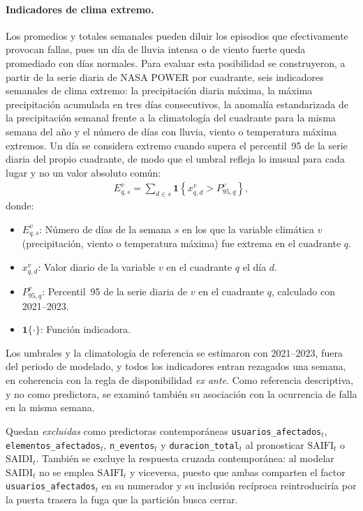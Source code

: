 \paragraph{Indicadores de clima extremo.} Los promedios y totales semanales pueden diluir los episodios que efectivamente provocan fallas, pues un día de lluvia intensa o de viento fuerte queda promediado con días normales. Para evaluar esta posibilidad se construyeron, a partir de la serie diaria de NASA POWER por cuadrante, seis indicadores semanales de clima extremo: la precipitación diaria máxima, la máxima precipitación acumulada en tres días consecutivos, la anomalía estandarizada de la precipitación semanal frente a la climatología del cuadrante para la misma semana del año y el número de días con lluvia, viento o temperatura máxima extremos. Un día se considera extremo cuando supera el percentil~95 de la serie diaria del propio cuadrante, de modo que el umbral refleja lo inusual para cada lugar y no un valor absoluto común:
\begin{equation}
    \begin{aligned}
    E_{q,s}^{v} = \sum_{d \in s} \mathbf{1}\left\{ x_{q,d}^{v} > P_{95,q}^{v} \right\},
    \end{aligned}
    \label{eq:dias_extremos}
\end{equation}
donde:
\begin{itemize}
    \item $E_{q,s}^{v}$: Número de días de la semana $s$ en los que la variable climática $v$ (precipitación, viento o temperatura máxima) fue extrema en el cuadrante $q$.
    \item $x_{q,d}^{v}$: Valor diario de la variable $v$ en el cuadrante $q$ el día $d$.
    \item $P_{95,q}^{v}$: Percentil~95 de la serie diaria de $v$ en el cuadrante $q$, calculado con 2021--2023.
    \item $\mathbf{1}\{\cdot\}$: Función indicadora.
\end{itemize}
Los umbrales y la climatología de referencia se estimaron con 2021--2023, fuera del periodo de modelado, y todos los indicadores entran rezagados una semana, en coherencia con la regla de disponibilidad \emph{ex ante}. Como referencia descriptiva, y no como predictora, se examinó también su asociación con la ocurrencia de falla en la misma semana.

Quedan \textit{excluidas} como predictoras contemporáneas \texttt{usuarios\_afectados}$_t$, \texttt{elementos\_afectados}$_t$, \texttt{n\_eventos}$_t$ y \texttt{duracion\_total}$_t$ al pronosticar $\mathrm{SAIFI}_t$ o $\mathrm{SAIDI}_t$. También se excluye la respuesta cruzada contemporánea: al modelar $\mathrm{SAIDI}_t$ no se emplea $\mathrm{SAIFI}_t$ y viceversa, puesto que ambas comparten el factor \texttt{usuarios\_afectados}$_t$ en su numerador y su inclusión recíproca reintroduciría por la puerta trasera la fuga que la partición busca cerrar.

